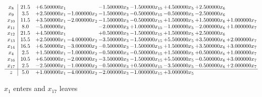 \documentclass[10pt]{article}
\begin{document}
 \[\begin{array}{c| c c@{\hskip 2pt} c@{\hskip 2pt} c@{\hskip 2pt} c@{\hskip 2pt} c@{\hskip 2pt} c@{\hskip 2pt} c@{\hskip 2pt} }
 x_{8}   &  21.5 & + 6.500000 x_{1} &   & -1.500000 x_{3} & -1.500000 x_{15} & + 4.500000 x_{5} & + 2.500000 x_{6} &   \\
 x_{9}   &  3.5 & + 2.500000 x_{1} & -1.000000 x_{2} & -1.500000 x_{3} & -0.500000 x_{15} & -0.500000 x_{5} & -2.500000 x_{6} &   \\
 x_{10}   &  11.5 & + 3.500000 x_{1} & -2.000000 x_{2} & -1.500000 x_{3} & -0.500000 x_{15} & + 1.500000 x_{5} & + 1.500000 x_{6} & + 1.000000 x_{7}\\
 x_{11}   &  8.0 & -5.000000 x_{1} &   & -2.000000 x_{3} & + 1.000000 x_{15} & -1.000000 x_{5} & -2.000000 x_{6} & + 1.000000 x_{7}\\
 x_{12}   &  21.5 & + 4.500000 x_{1} &   & + 0.500000 x_{3} & -1.500000 x_{15} & + 1.500000 x_{5} & + 2.500000 x_{6} &   \\
 x_{13}   &  15.5 & + 2.500000 x_{1} & -4.000000 x_{2} & -3.500000 x_{3} & -1.500000 x_{15} & + 5.500000 x_{5} & + 3.500000 x_{6} & + 2.000000 x_{7}\\
 x_{14}   &  16.5 & + 6.500000 x_{1} & -3.000000 x_{2} & -0.500000 x_{3} & -1.500000 x_{15} & + 1.500000 x_{5} & + 3.500000 x_{6} & + 3.000000 x_{7}\\
 x_{4}   &  2.5 & + 1.500000 x_{1} & -1.000000 x_{2} & -0.500000 x_{3} & -0.500000 x_{15} & + 1.500000 x_{5} & + 0.500000 x_{6} & + 1.000000 x_{7}\\
 x_{16}   &  10.5 & + 6.500000 x_{1} & -2.000000 x_{2} & -3.500000 x_{3} & -1.500000 x_{15} & + 5.500000 x_{5} & -0.500000 x_{6} & + 3.000000 x_{7}\\
 x_{17}   &  2.5 & -2.500000 x_{1} & -1.000000 x_{2} & -0.500000 x_{3} & + 0.500000 x_{15} & -3.500000 x_{5} & -0.500000 x_{6} & + 2.000000 x_{7}\\
\hline
z    &  5.0 & + 1.000000 x_{1} & -4.000000 x_{2} & -2.000000 x_{3} & -1.000000 x_{15} & + 3.000000 x_{5} &    &   \\
\end{array}\]


 $ x_{1} $ enters and $ x_{17} $ leaves 
\end{document}
